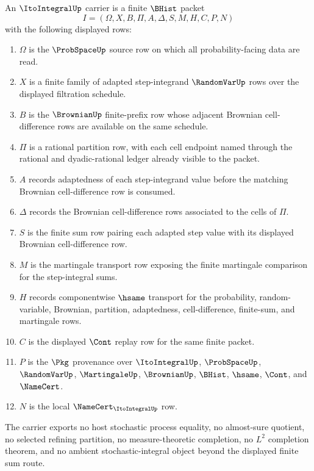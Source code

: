 \begin{definition}
\label{def:ito-integral-carrier}
An $\ItoIntegralUp$ carrier is a finite $\BHist$ packet
$$
I=(\Omega,X,B,\Pi,A,\Delta,S,M,H,C,P,N)
$$
with the following displayed rows:
\begin{enumerate}
\item $\Omega$ is the $\ProbSpaceUp$ source row on which all probability-facing data are read.
\item $X$ is a finite family of adapted step-integrand $\RandomVarUp$ rows over the displayed filtration schedule.
\item $B$ is the $\BrownianUp$ finite-prefix row whose adjacent Brownian cell-difference rows are available on the same schedule.
\item $\Pi$ is a rational partition row, with each cell endpoint named through the rational and dyadic-rational ledger already visible to the packet.
\item $A$ records adaptedness of each step-integrand value before the matching Brownian cell-difference row is consumed.
\item $\Delta$ records the Brownian cell-difference rows associated to the cells of $\Pi$.
\item $S$ is the finite sum row pairing each adapted step value with its displayed Brownian cell-difference row.
\item $M$ is the martingale transport row exposing the finite martingale comparison for the step-integral sums.
\item $H$ records componentwise $\hsame$ transport for the probability, random-variable, Brownian, partition, adaptedness, cell-difference, finite-sum, and martingale rows.
\item $C$ is the displayed $\Cont$ replay row for the same finite packet.
\item $P$ is the $\Pkg$ provenance over $\ItoIntegralUp$, $\ProbSpaceUp$, $\RandomVarUp$, $\MartingaleUp$, $\BrownianUp$, $\BHist$, $\hsame$, $\Cont$, and $\NameCert$.
\item $N$ is the local $\NameCert_{\ItoIntegralUp}$ row.
\end{enumerate}

The carrier exports no host stochastic process equality, no almost-sure quotient, no selected refining partition, no measure-theoretic completion, no $L^2$ completion theorem, and no ambient stochastic-integral object beyond the displayed finite sum route.
\end{definition}

